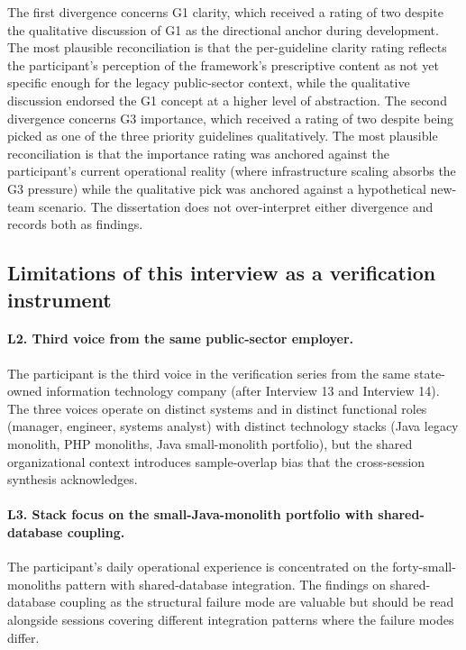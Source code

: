 The first divergence concerns G1 clarity, which received a rating of two despite the qualitative discussion of G1 as the directional anchor during development. The most plausible reconciliation is that the per-guideline clarity rating reflects the participant's perception of the framework's prescriptive content as not yet specific enough for the legacy public-sector context, while the qualitative discussion endorsed the G1 concept at a higher level of abstraction. The second divergence concerns G3 importance, which received a rating of two despite being picked as one of the three priority guidelines qualitatively. The most plausible reconciliation is that the importance rating was anchored against the participant's current operational reality (where infrastructure scaling absorbs the G3 pressure) while the qualitative pick was anchored against a hypothetical new-team scenario. The dissertation does not over-interpret either divergence and records both as findings.

\subsection*{Limitations of this interview as a verification instrument}

\paragraph*{L2. Third voice from the same public-sector employer.} The participant is the third voice in the verification series from the same state-owned information technology company (after Interview 13 and Interview 14). The three voices operate on distinct systems and in distinct functional roles (manager, engineer, systems analyst) with distinct technology stacks (Java legacy monolith, PHP monoliths, Java small-monolith portfolio), but the shared organizational context introduces sample-overlap bias that the cross-session synthesis acknowledges.

\paragraph*{L3. Stack focus on the small-Java-monolith portfolio with shared-database coupling.} The participant's daily operational experience is concentrated on the forty-small-monoliths pattern with shared-database integration. The findings on shared-database coupling as the structural failure mode are valuable but should be read alongside sessions covering different integration patterns where the failure modes differ.

